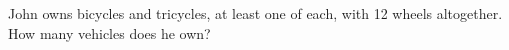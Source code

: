 John owns bicycles and tricycles, at least one of each, with 12 wheels altogether. How many vehicles does he own?
